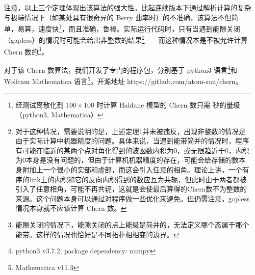 注意，以上三个定理体现出该算法的强大性。比起连续版本下通过解析计算的复杂与极端情况下（如某处具有很奇异的 Berry 曲率时）的不准确，该算法不但简单，易算，速度快\footnote{经测试离散化到 $100\times100$ 时计算 Haldane 模型的 Chern 数只需 秒的量级（python3, Mathematica）}，而且准确，鲁棒。实际运行代码时，只有当遇到能隙关闭（gapless）的情况时可能会给出非整数的结果\footnote{对于这种情况，需要说明的是，上述定理1并未被违反，出现非整数的情况是由于实际计算中机器精度的问题。具体来说，当遇到能带简并的情况时，程序有可能在临近的某两个点对角化得到的波函数内积为0，或无限趋近于0，内积为0本身是没有问题的，但由于计算机机器精度的存在，可能会给存储的数本身附加上一个很小的实部和虚部，而这会引入任意的相角。理论上讲，一个有序的link上的内积和它的反向内积得到的数应互为共轭，但此时由于两者都被引入了任意相角，可能不再共轭，这就是会使最后算得的Chern数不为整数的来源。这个问题本身可以通过对程序做一些优化来避免。但仍需注意，gapless 情况本身就不应该计算 Chern 数。}——而这种情况本是不被允许计算 Chern 数的\footnote{能隙关闭的情况下，能隙关闭的点上能级是简并的，无法定义哪个态属于那个能带\cite{topobook}。这样的情况也恰好是不同拓扑相相变的边界。}。


对于该 Chern 数算法，我们开发了专门的程序包，分别基于 python3 语言\footnote{python3 v3.7.2, package dependency: numpy}和 Wolfram Mathematica 语言\footnote{Mathematica v11.3}。开源地址\cite{repo-chern} https://github.com/atom-sun/chern。
